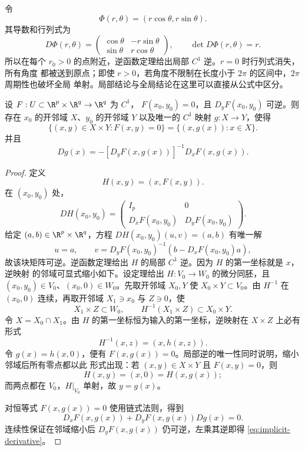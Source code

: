 \begin{example}[极坐标映射]\label{ex:2-4-1-2}
令
\[
 \Phi(r,\theta)=(r\cos\theta,r\sin\theta).
\]
其导数和行列式为
\[
 D\Phi(r,\theta)=
 \begin{pmatrix}
 \cos\theta&-r\sin\theta\\
 \sin\theta&r\cos\theta
 \end{pmatrix},
 \qquad \det D\Phi(r,\theta)=r.
\]
所以在每个 $r_0>0$ 的点附近，逆函数定理给出局部 $C^1$ 逆。$r=0$ 时行列式消失，所有角度
都被送到原点；即使 $r>0$，若角度不限制在长度小于 $2\pi$ 的区间中，$2\pi$ 周期性也破坏全局
单射。局部结论与全局结论在这里可以直接从公式中区分。
\end{example}

\begin{corollary}[隐函数定理]\label{corollary:2-4-1-4}
设 $F:U\subset\R^p\times\R^q\to\R^q$ 为 $C^1$，
$F(x_0,y_0)=0$，且 $D_yF(x_0,y_0)$ 可逆。则存在 $x_0$ 的开邻域 $X$、$y_0$ 的开邻域
$Y$ 以及唯一的 $C^1$ 映射 $g:X\to Y$，使得
\[
 \{(x,y)\in X\times Y:F(x,y)=0\}
 =\{(x,g(x)):x\in X\}.
\]
并且
\[
 Dg(x)=-[D_yF(x,g(x))]^{-1}D_xF(x,g(x)).
 \tag{2.4.10}\label{eq:implicit-derivative}
\]
\end{corollary}

\begin{proof}
定义
\[
 H(x,y)=(x,F(x,y)).
\]
在 $(x_0,y_0)$ 处，
\[
 DH(x_0,y_0)=
 \begin{pmatrix}
 I_p&0\\
 D_xF(x_0,y_0)&D_yF(x_0,y_0)
 \end{pmatrix}.
\]
给定 $(a,b)\in\R^p\times\R^q$，方程
$DH(x_0,y_0)(u,v)=(a,b)$ 有唯一解
\[
 u=a,\qquad
 v=D_yF(x_0,y_0)^{-1}(b-D_xF(x_0,y_0)a),
\]
故该块矩阵可逆。逆函数定理给出 $H$ 的局部 $C^1$ 逆。因为 $H$ 的第一坐标就是 $x$，逆映射
的邻域可显式缩小如下。设定理给出
$H:V_0\to W_0$ 的微分同胚，且 $(x_0,y_0)\in V_0$、$(x_0,0)\in W_0$。先取开邻域
$X_0,Y$ 使 $X_0\times Y\subset V_0$。由 $H^{-1}$ 在 $(x_0,0)$ 连续，再取开邻域
$X_1\ni x_0$ 与 $Z\ni0$，使
\[
 X_1\times Z\subset W_0,
 \qquad H^{-1}(X_1\times Z)\subset X_0\times Y.
\]
令 $X=X_0\cap X_1$。由 $H$ 的第一坐标恒为输入的第一坐标，逆映射在 $X\times Z$ 上必有形式
\[
 H^{-1}(x,z)=(x,h(x,z)).
\]
令 $g(x)=h(x,0)$，便有 $F(x,g(x))=0$。局部逆的唯一性同时说明，缩小邻域后所有零点都以此
形式出现：若 $(x,y)\in X\times Y$ 且 $F(x,y)=0$，则
\[
 H(x,y)=(x,0)=H(x,g(x));
\]
而两点都在 $V_0$，$H|_{V_0}$ 单射，故 $y=g(x)$。

对恒等式 $F(x,g(x))=0$ 使用链式法则，得到
\[
 D_xF(x,g(x))+D_yF(x,g(x))Dg(x)=0.
\]
连续性保证在邻域缩小后 $D_yF(x,g(x))$ 仍可逆，左乘其逆即得
\eqref{eq:implicit-derivative}。
\end{proof}

